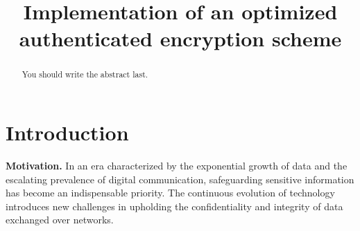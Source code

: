 \documentclass[letterpaper]{article}
\title{Implementation of an optimized authenticated encryption scheme}
\newcommand{\mypar}[1]{{\bf #1.}}
\begin{document}
%
\maketitle
%


\begin{abstract}
	You should write the abstract last.
\end{abstract}

\section{Introduction}\label{sec:intro}


\mypar{Motivation}
%
%
In an era characterized by the exponential growth of data and the escalating prevalence of digital communication, safeguarding sensitive information has become an indispensable priority. The continuous evolution of technology introduces new challenges in upholding the confidentiality and integrity of data exchanged over networks.
\end{document}
